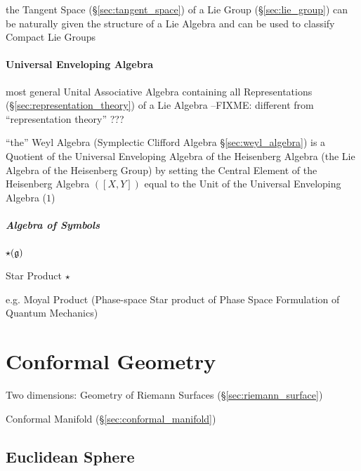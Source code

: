 \begin{itemize}
the Tangent Space (\S\ref{sec:tangent_space}) of a Lie Group
(\S\ref{sec:lie_group}) can be naturally given the structure of a Lie Algebra
and can be used to classify Compact Lie Groups



\paragraph{Universal Enveloping Algebra}
\label{sec:universal_enveloping_algebra}\hfill

most general Unital Associative Algebra containing all Representations
(\S\ref{sec:representation_theory}) of a Lie Algebra
--FIXME: different from ``representation theory'' ???

\fist ``the'' Weyl Algebra (Symplectic Clifford Algebra
\S\ref{sec:weyl_algebra}) is a Quotient of the Universal Enveloping Algebra of
the Heisenberg Algebra (the Lie Algebra of the Heisenberg Group) by setting the
Central Element of the Heisenberg Algebra $([X,Y])$ equal to the Unit of the
Universal Enveloping Algebra ($1$)



\subparagraph{Algebra of Symbols}\label{sec:symbol_algebra}\hfill

$\star(\mathfrak{g})$

Star Product $\star$

e.g. Moyal Product (Phase-space Star product of Phase Space Formulation of
Quantum Mechanics)



\section{Conformal Geometry}\label{sec:conformal_geometry}

Two dimensions: Geometry of Riemann Surfaces
(\S\ref{sec:riemann_surface})

\fist Conformal Manifold (\S\ref{sec:conformal_manifold})



\subsection{Euclidean Sphere}\label{sec:euclidean_sphere}


\end{itemize}
